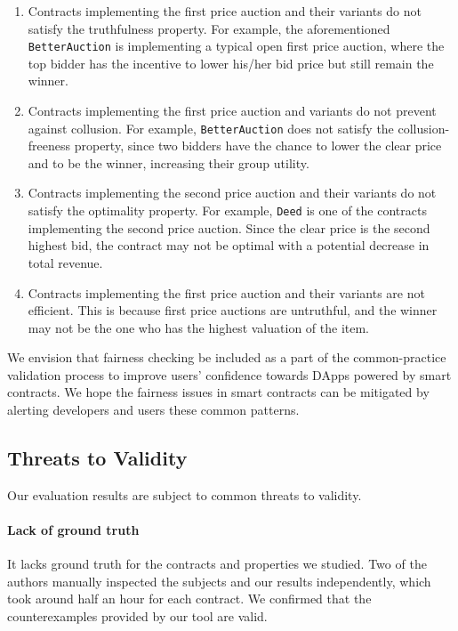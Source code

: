 \begin{enumerate}[leftmargin=*]
	\item Contracts implementing the first price auction and their variants do not satisfy the
	truthfulness property.
	For example, the aforementioned \texttt{BetterAuction} is implementing a typical open first
	price auction, where the top bidder has the incentive to lower his/her bid price but still
	remain the winner.
	\item Contracts implementing the first price auction and variants do not prevent against
	collusion.
	For example, \texttt{BetterAuction} does not satisfy the collusion-freeness property, since two
	bidders have the chance to lower the clear price and to be the winner, increasing their
	group utility.
	\item Contracts implementing the second price auction and their variants do not satisfy the
	optimality property.
	For example, \texttt{Deed} is one of the contracts implementing the second price auction.
	Since the clear price is the second highest bid, the contract may not be optimal with a potential
	decrease in total revenue.
	\item Contracts implementing the first price auction and their variants are not efficient.
	This is because first price auctions are untruthful, and the winner may not be the one who has
	the highest valuation of the item.
\end{enumerate}

We envision that fairness checking be included as a part of the common-practice validation process
to improve users' confidence towards DApps powered by smart contracts.
We hope the fairness issues in smart contracts can be mitigated by alerting developers and users
these common patterns.

\subsection{Threats to Validity}

Our evaluation results are subject to common threats to validity.
\paragraph{Lack of ground truth}
It lacks ground truth for the contracts and properties we studied.
Two of the authors manually inspected the subjects and our results independently, which
took around half an hour for each contract.
We confirmed that the counterexamples provided by our tool are valid.

